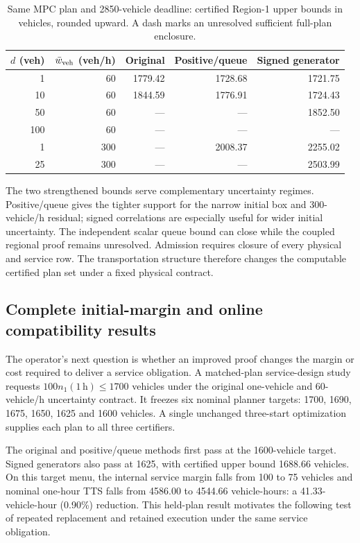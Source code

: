 \documentclass[preprint,12pt]{elsarticle}
\numberwithin{equation}{section}
\begin{document}
\begin{table}[t]
\centering
\caption{Same MPC plan and 2850-vehicle deadline: certified Region-1 upper
bounds in vehicles, rounded upward. A dash marks an unresolved sufficient
full-plan enclosure.}
\label{supp:detail:tab:structure-frontier}
\small
\setlength{\tabcolsep}{4pt}
\begin{tabular}{@{}rrrrr@{}}
\toprule
$d$ (veh) & $\bar w_{\rm veh}$ (veh/h) & Original & Positive/queue & Signed generator\\
\midrule
1 & 60 & 1779.42 & 1728.68 & 1721.75\\
10 & 60 & 1844.59 & 1776.91 & 1724.43\\
50 & 60 & --- & --- & 1852.50\\
100 & 60 & --- & --- & ---\\
1 & 300 & --- & 2008.37 & 2255.02\\
25 & 300 & --- & --- & 2503.99\\
\bottomrule
\end{tabular}
\end{table}

The two strengthened bounds serve complementary uncertainty regimes.
Positive/queue gives the tighter support for the narrow initial box and
300-vehicle/h residual; signed correlations are especially useful for wider
initial uncertainty. The independent scalar queue bound can close while
the coupled regional proof remains unresolved. Admission requires closure
of every physical and service row. The transportation structure therefore
changes the computable certified plan set under a fixed physical contract.

\subsection{Complete initial-margin and online compatibility results}
\label{app:structure-online-details}


The operator's next question is whether an improved proof changes the
margin or cost required to deliver a service obligation. A matched-plan
service-design study requests $100n_1(1\,\mathrm h)\le1700$ vehicles under
the original one-vehicle and 60-vehicle/h uncertainty contract. It freezes
six nominal planner targets: 1700, 1690, 1675, 1650, 1625 and 1600 vehicles.
A single unchanged three-start optimization supplies each plan to all
three certifiers.

The original and positive/queue methods first pass at the 1600-vehicle
target. Signed generators also pass at 1625, with certified upper bound
1688.66 vehicles. On this target menu, the internal service margin
falls from 100 to 75 vehicles and nominal one-hour TTS falls from 4586.00
to 4544.66 vehicle-hours: a 41.33-vehicle-hour (0.90\%) reduction. This
held-plan result motivates the following test of repeated replacement and
retained execution under the same service obligation.
\end{document}
